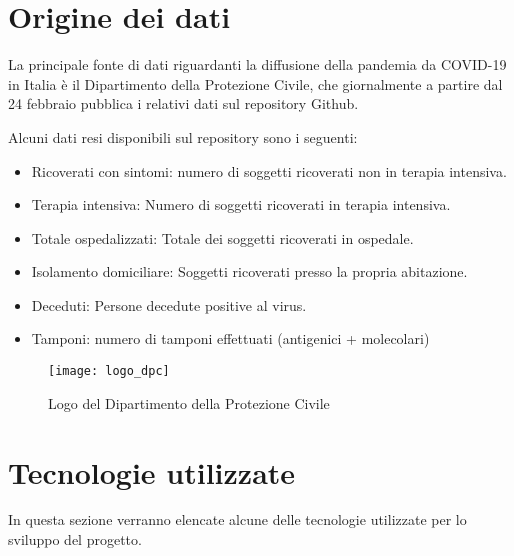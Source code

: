 
\section{Origine dei dati}
La principale fonte di dati riguardanti la diffusione della pandemia da COVID-19 in Italia è il Dipartimento della Protezione Civile, che giornalmente a partire dal 24 febbraio pubblica i relativi dati sul repository Github\cite{repository}.

Alcuni dati resi disponibili sul repository sono i seguenti:
\begin{itemize}
    \item Ricoverati con sintomi: numero di soggetti ricoverati non in terapia intensiva.
    \item Terapia intensiva: Numero di soggetti ricoverati in terapia intensiva.
    \item Totale ospedalizzati: Totale dei soggetti ricoverati in ospedale.
    \item Isolamento domiciliare: Soggetti ricoverati presso la propria abitazione.
    \item Deceduti: Persone decedute positive al virus.
    \item Tamponi: numero di tamponi effettuati (antigenici + molecolari)
\end{itemize}


\begin{figure}[htp]
    \centering
    \texttt{[image: logo\_dpc]}
    \caption{Logo del Dipartimento della Protezione Civile}
\end{figure}


\section{Tecnologie utilizzate}
In questa sezione verranno elencate alcune delle tecnologie utilizzate per lo sviluppo del progetto.

